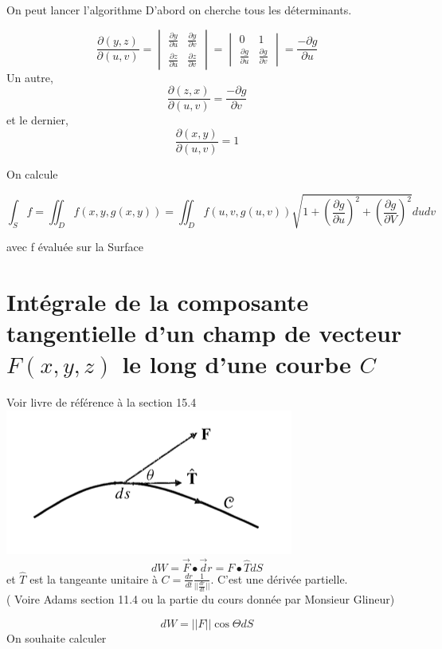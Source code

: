 On peut lancer l'algorithme
D'abord on cherche tous les déterminants.

\[\frac{\partial (y,z)}{\partial (u,v)} =
\begin{vmatrix}
\frac{\partial y}{\partial u}& \frac{\partial y}{\partial v}\\
\frac{\partial z}{\partial u}& \frac{\partial z}{\partial v}
\end{vmatrix} =
\begin{vmatrix}
0&1\\
\frac{\partial g}{\partial u}&\frac{\partial g}{\partial v}
\end{vmatrix}
= \frac{-\partial g}{\partial u}\]
Un autre,
\[\frac{\partial (z,x)}{\partial (u,v)} = \frac{-\partial g}{\partial v}\]
et le dernier,
\[\frac{\partial (x,y)}{\partial (u,v)} = 1\]

On calcule

\[\int_S f = \iint_D f(x,y,g(x,y)) = \iint_D f(u,v,g(u,v))\sqrt{1+(\frac{\partial g}{\partial u})^2 +(\frac{\partial g}{\partial V})^2 } dudv
\]

avec f évaluée sur la Surface

\section{Intégrale de la composante tangentielle d'un champ de vecteur $F(x,y,z)$ le long d'une courbe $C$}

Voir livre de référence à la section 15.4\\


\includegraphics[scale=0.5]{vec1.png}\\

\[dW = \vec F\bullet \vec dr = F\bullet \hat{T} dS\]
et $\hat{T}$ est la tangeante unitaire à $C=\frac{dr}{dt}\frac{1}{||\frac{dr}{dt}||}$. C'est une dérivée partielle.\\( Voire Adams section 11.4 ou la partie du cours donnée par Monsieur Glineur)

\[dW = ||F|| \cos \Theta dS\]
On souhaite calculer

